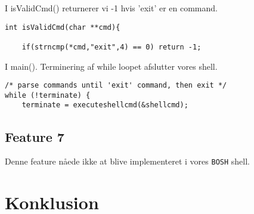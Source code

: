 \documentclass[danish]{report}
\begin{document}
I isValidCmd() returnerer vi -1 hvis 'exit' er en command.
\begin{lstlisting}
int isValidCmd(char **cmd){
	
	if(strncmp(*cmd,"exit",4) == 0) return -1;
\end{lstlisting}

I main(). Terminering af while loopet afslutter vores shell. 
\begin{lstlisting}
/* parse commands until 'exit' command, then exit */
while (!terminate) {
	terminate = executeshellcmd(&shellcmd);
\end{lstlisting}

\section{Feature 7}

Denne feature nåede ikke at blive implementeret i vores {\tt BOSH} shell.

\chapter{Konklusion}
\end{document}

